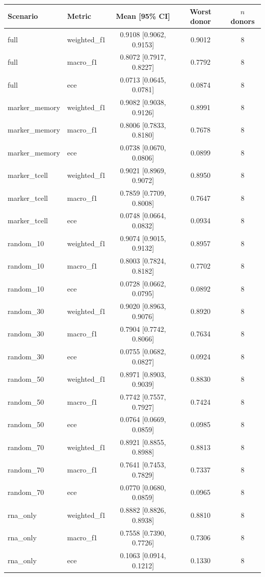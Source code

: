 \begin{tabular}{llccc}
\toprule
Scenario & Metric & Mean [95\% CI] & Worst donor & $n$ donors \\
\midrule
full & weighted\_f1 & 0.9108 [0.9062, 0.9153] & 0.9012 & 8 \\
full & macro\_f1 & 0.8072 [0.7917, 0.8227] & 0.7792 & 8 \\
full & ece & 0.0713 [0.0645, 0.0781] & 0.0874 & 8 \\
marker\_memory & weighted\_f1 & 0.9082 [0.9038, 0.9126] & 0.8991 & 8 \\
marker\_memory & macro\_f1 & 0.8006 [0.7833, 0.8180] & 0.7678 & 8 \\
marker\_memory & ece & 0.0738 [0.0670, 0.0806] & 0.0899 & 8 \\
marker\_tcell & weighted\_f1 & 0.9021 [0.8969, 0.9072] & 0.8950 & 8 \\
marker\_tcell & macro\_f1 & 0.7859 [0.7709, 0.8008] & 0.7647 & 8 \\
marker\_tcell & ece & 0.0748 [0.0664, 0.0832] & 0.0934 & 8 \\
random\_10 & weighted\_f1 & 0.9074 [0.9015, 0.9132] & 0.8957 & 8 \\
random\_10 & macro\_f1 & 0.8003 [0.7824, 0.8182] & 0.7702 & 8 \\
random\_10 & ece & 0.0728 [0.0662, 0.0795] & 0.0892 & 8 \\
random\_30 & weighted\_f1 & 0.9020 [0.8963, 0.9076] & 0.8920 & 8 \\
random\_30 & macro\_f1 & 0.7904 [0.7742, 0.8066] & 0.7634 & 8 \\
random\_30 & ece & 0.0755 [0.0682, 0.0827] & 0.0924 & 8 \\
random\_50 & weighted\_f1 & 0.8971 [0.8903, 0.9039] & 0.8830 & 8 \\
random\_50 & macro\_f1 & 0.7742 [0.7557, 0.7927] & 0.7424 & 8 \\
random\_50 & ece & 0.0764 [0.0669, 0.0859] & 0.0985 & 8 \\
random\_70 & weighted\_f1 & 0.8921 [0.8855, 0.8988] & 0.8813 & 8 \\
random\_70 & macro\_f1 & 0.7641 [0.7453, 0.7829] & 0.7337 & 8 \\
random\_70 & ece & 0.0770 [0.0680, 0.0859] & 0.0965 & 8 \\
rna\_only & weighted\_f1 & 0.8882 [0.8826, 0.8938] & 0.8810 & 8 \\
rna\_only & macro\_f1 & 0.7558 [0.7390, 0.7726] & 0.7306 & 8 \\
rna\_only & ece & 0.1063 [0.0914, 0.1212] & 0.1330 & 8 \\
\bottomrule
\end{tabular}

